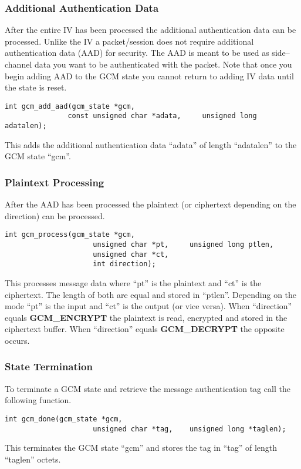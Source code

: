 \documentclass[a4paper]{book}
\begin{document}
\subsubsection{Additional Authentication Data}
After the entire IV has been processed the additional authentication data can be processed.  Unlike the IV a packet/session does not require additional
authentication data (AAD) for security.  The AAD is meant to be used as side--channel data you want to be authenticated with the packet.  Note that once
you begin adding AAD to the GCM state you cannot return to adding IV data until the state is reset.

\begin{verbatim}
int gcm_add_aad(gcm_state *gcm, 
               const unsigned char *adata,     unsigned long adatalen);
\end{verbatim}
This adds the additional authentication data ``adata'' of length ``adatalen'' to the GCM state ``gcm''.

\subsubsection{Plaintext Processing}
After the AAD has been processed the plaintext (or ciphertext depending on the direction) can be processed.  

\begin{verbatim}
int gcm_process(gcm_state *gcm,
                     unsigned char *pt,     unsigned long ptlen,
                     unsigned char *ct,
                     int direction);
\end{verbatim}
This processes message data where ``pt'' is the plaintext and ``ct'' is the ciphertext.  The length of both are equal and stored in ``ptlen''.  Depending on the 
mode ``pt'' is the input and ``ct'' is the output (or vice versa).  When ``direction'' equals \textbf{GCM\_ENCRYPT} the plaintext is read, encrypted and stored
in the ciphertext buffer.  When ``direction'' equals \textbf{GCM\_DECRYPT} the opposite occurs.

\subsubsection{State Termination}
To terminate a GCM state and retrieve the message authentication tag call the following function.

\begin{verbatim}
int gcm_done(gcm_state *gcm, 
                     unsigned char *tag,    unsigned long *taglen);
\end{verbatim}
This terminates the GCM state ``gcm'' and stores the tag in ``tag'' of length ``taglen'' octets.
\end{document}
